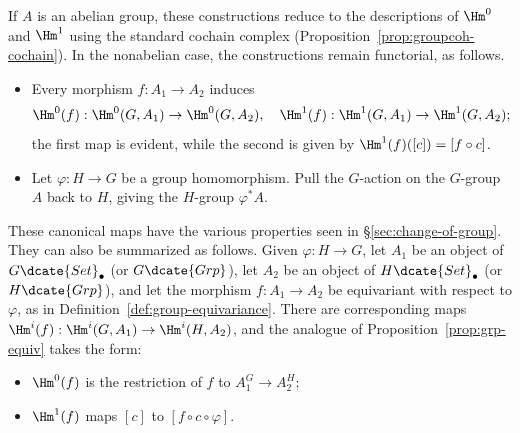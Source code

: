 If $A$ is an abelian group, these constructions reduce to the descriptions
of $\Hm^0$ and $\Hm^1$ using the standard cochain complex
(Proposition~\ref{prop:groupcoh-cochain}). In the nonabelian case, the
constructions remain functorial, as follows.
\begin{itemize}
	\item Every morphism $f:A_1\to A_2$ induces
	\begin{gather*}
		\Hm^0(f): \Hm^0(G, A_1) \to \Hm^0(G, A_2), \quad
		\Hm^1(f): \Hm^1(G, A_1) \to \Hm^1(G, A_2);
	\end{gather*}
	the first map is evident, while the second is given by
	$\Hm^1(f)([c])=[f\circ c]$.

	\item Let $\varphi:H\to G$ be a group homomorphism. Pull the $G$-action
	on the $G$-group $A$ back to $H$, giving the $H$-group $\varphi^*A$.
\end{itemize}

These canonical maps have the various properties seen in
\S\ref{sec:change-of-group}. They can also be summarized as follows. Given
$\varphi:H\to G$, let $A_1$ be an object of $G\dcate{Set}_\bullet$ (or
$G\dcate{Grp}$), let $A_2$ be an object of $H\dcate{Set}_\bullet$ (or
$H\dcate{Grp}$), and let the morphism $f:A_1\to A_2$ be equivariant with
respect to $\varphi$, as in Definition~\ref{def:group-equivariance}. There
are corresponding maps $\Hm^i(f):\Hm^i(G,A_1)\to\Hm^i(H,A_2)$, and the
analogue of Proposition~\ref{prop:grp-equiv} takes the form:
\begin{itemize}
	\item $\Hm^0(f)$ is the restriction of $f$ to $A_1^G\to A_2^H$;
	\item $\Hm^1(f)$ maps $[c]$ to $[f\circ c\circ\varphi]$.
\end{itemize}

